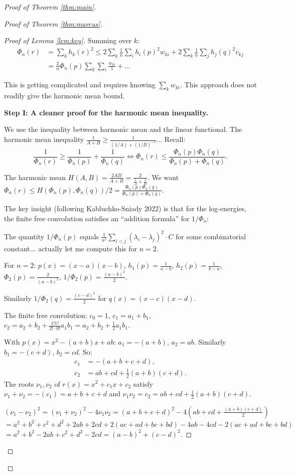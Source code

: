 \documentclass[12pt]{article}
\theoremstyle{definition}
\begin{document}
\begin{proof}[Proof of Theorem \ref{thm:main}]
\begin{proof}[Proof of Theorem \ref{thm:marcus}]
\begin{proof}[Proof of Lemma \ref{lem:key}]
Summing over $k$:
\begin{align*}
\Phi_n(r) &= \sum_k h_k(r)^2 \leq 2\sum_k\frac{1}{n}\sum_i h_i(p)^2 w_{ki} + 2\sum_k\frac{1}{n}\sum_j h_j(q)^2 v_{kj}\\
&= \frac{2}{n}\Phi_n(p)\sum_k\sum_i\frac{w_{ki}}{1} + \ldots
\end{align*}

This is getting complicated and requires knowing $\sum_k w_{ki}$. This approach does not readily give the harmonic mean bound.

\textbf{Step I: A cleaner proof for the harmonic mean inequality.}

We use the inequality between harmonic mean and the linear functional. The harmonic mean inequality $\frac{1}{A+B}\geq\frac{1}{(1/A)+(1/B)^{-1}}$... Recall:
$$\frac{1}{\Phi_n(r)}\geq\frac{1}{\Phi_n(p)}+\frac{1}{\Phi_n(q)} \iff \Phi_n(r)\leq\frac{\Phi_n(p)\Phi_n(q)}{\Phi_n(p)+\Phi_n(q)}.$$

The harmonic mean $H(A,B) = \frac{2AB}{A+B} = \frac{2}{\frac{1}{A}+\frac{1}{B}}$. We want $\Phi_n(r) \leq H(\Phi_n(p),\Phi_n(q))/2 = \frac{\Phi_n(p)\Phi_n(q)}{\Phi_n(p)+\Phi_n(q)}$.

The key insight (following Kabluchko-Sniady 2022) is that for the log-energies, the finite free convolution satisfies an ``addition formula'' for $1/\Phi_n$:

The quantity $1/\Phi_n(p)$ equals $\frac{1}{n^2}\sum_{i<j}(\lambda_i-\lambda_j)^2 \cdot C$ for some combinatorial constant... actually let me compute this for $n=2$.

For $n=2$: $p(x) = (x-a)(x-b)$, $h_1(p) = \frac{1}{a-b}$, $h_2(p) = \frac{1}{b-a}$, $\Phi_2(p) = \frac{2}{(a-b)^2}$, $1/\Phi_2(p) = \frac{(a-b)^2}{2}$.

Similarly $1/\Phi_2(q) = \frac{(c-d)^2}{2}$ for $q(x)=(x-c)(x-d)$.

The finite free convolution: $c_0=1$, $c_1 = a_1+b_1$, $c_2 = a_2+b_2+\frac{1!1!}{2!\cdot 0!}a_1b_1 = a_2+b_2+\frac{1}{2}a_1b_1$.

With $p(x)=x^2-(a+b)x+ab$: $a_1=-(a+b)$, $a_2=ab$. Similarly $b_1=-(c+d)$, $b_2=cd$. So:
\begin{align*}
c_1 &= -(a+b+c+d),\\
c_2 &= ab+cd+\frac{1}{2}(a+b)(c+d).
\end{align*}
The roots $\nu_1,\nu_2$ of $r(x) = x^2+c_1 x+c_2$ satisfy $\nu_1+\nu_2 = -(c_1) = a+b+c+d$ and $\nu_1\nu_2 = c_2 = ab+cd+\frac{1}{2}(a+b)(c+d)$.

$(\nu_1-\nu_2)^2 = (\nu_1+\nu_2)^2-4\nu_1\nu_2 = (a+b+c+d)^2-4(ab+cd+\frac{(a+b)(c+d)}{2})$
$= a^2+b^2+c^2+d^2+2ab+2cd+2(ac+ad+bc+bd)-4ab-4cd-2(ac+ad+bc+bd)$
$= a^2+b^2-2ab+c^2+d^2-2cd = (a-b)^2+(c-d)^2$.


\end{proof}
\end{proof}
\end{proof}
\end{document}
